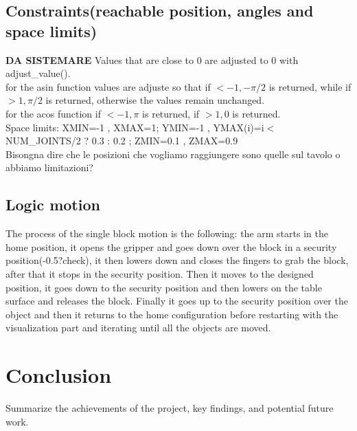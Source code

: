 \documentclass[12pt,a4paper]{article}
\begin{document}
\subsection{Constraints(reachable position, angles and space limits)}\label{subsec:constraints}
\textbf{DA SISTEMARE} Values that are close to 0 are adjusted to 0 with adjust\_value().\\
for the asin function values are adjuste so that if $<-1, -\pi/2$ is returned, while if $>1, \pi/2$ is returned, otherwise the values remain unchanged.\\
for the acos function if $<-1, \pi$ is returned, if $>1, 0$ is returned.\\
Space limits: XMIN=-1 , XMAX=1; YMIN=-1 , YMAX(i)=i$<$NUM\_JOINTS/2 ? 0.3 : 0.2 ; ZMIN=0.1 , ZMAX=0.9\\
Bisongna dire che le posizioni che vogliamo raggiungere sono quelle sul tavolo o abbiamo limitazioni?

\subsection{Logic motion}\label{subsec:logic}
The process of the single block motion is the following: the arm starts in the home position, it opens the gripper and goes down over the block in a security position(-0.5?check), it then lowers down and closes the fingers to grab the block, after that it stops in the security position. Then it moves to the designed position, it goes down to the security position and then lowers on the table surface and releases the block. Finally it goes up to the security position over the object and then it returns to the home configuration before restarting with the visualization part and iterating until all the objects are moved.

\section{Conclusion}\label{sec:conclusion}
Summarize the achievements of the project, key findings, and potential future work. 
\end{document}
